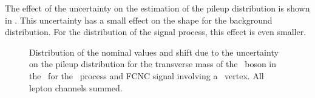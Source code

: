 The effect of the uncertainty on the estimation of the pileup distribution is shown in . This uncertainty has a small effect on the shape for the background distribution. For the distribution of the signal process, this effect is even smaller. 
\begin{figure}[htbp] 
	\centering 
	\caption{Distribution of the nominal values and shift due to  the uncertainty on the pileup distribution for the transverse mass of the \PW\ boson in the \STSR\ for the \WZ\ process and FCNC signal involving a \Zut\ vertex. All lepton channels summed. }
\label{fig:shiftBDTSTZutPU}
\end{figure}

